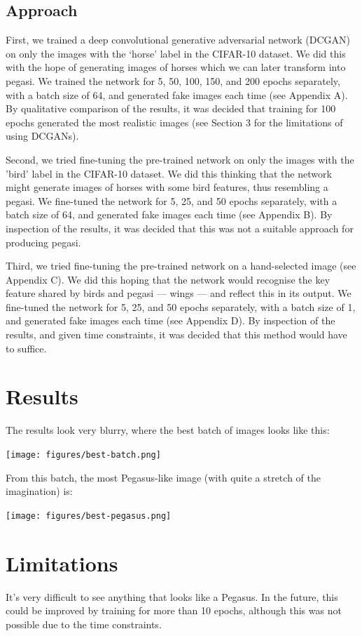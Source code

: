 \documentclass{article}
\begin{document}
\subsection{Approach}
First, we trained a deep convolutional generative adversarial network (DCGAN)~\cite{} on only the images with the `horse' label in the CIFAR-10 dataset. We did this with the hope of generating images of horses which we can later transform into pegasi. We trained the network for 5, 50, 100, 150, and 200 epochs separately, with a batch size of 64, and generated fake images each time (see Appendix A). By qualitative comparison of the results, it was decided that training for 100 epochs generated the most realistic images (see Section 3 for the limitations of using DCGANs).  

Second, we tried fine-tuning the pre-trained network on only the images with the 'bird' label in the CIFAR-10 dataset. We did this thinking that the network might generate images of horses with some bird features, thus resembling a pegasi. We fine-tuned the network for 5, 25, and 50 epochs separately, with a batch size of 64, and generated fake images each time (see Appendix B). By inspection of the results, it was decided that this was not a suitable approach for producing pegasi.  

Third, we tried fine-tuning the pre-trained network on a hand-selected image (see Appendix C). We did this hoping that the network would recognise the key feature shared by birds and pegasi --- wings --- and reflect this in its output. We fine-tuned the network for 5, 25, and 50 epochs separately, with a batch size of 1, and generated fake images each time (see Appendix D). By inspection of the results, and given time constraints, it was decided that this method would have to suffice.  


\section{Results}
The results look very blurry, where the best batch of images looks like this:
\begin{center}
    \texttt{[image: figures/best-batch.png]}
\end{center}
From this batch, the most Pegasus-like image (with quite a stretch of the imagination) is:
\begin{center}
    \texttt{[image: figures/best-pegasus.png]}
\end{center}

\section{Limitations}
It's very difficult to see anything that looks like a Pegasus. In the future, this could be improved by training for more than 10 epochs, although this was not possible due to the time constraints.
\end{document}
